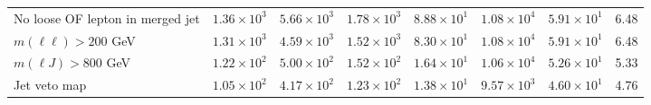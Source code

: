 \begin{table}[htp]
{\begin{tabular}{l | c c c c | c c c}
      No loose OF lepton in merged jet & $1.36 \times 10^{3}$ & $5.66 \times 10^{3}$ & $1.78 \times 10^{3}$ & $8.88 \times 10^{1}$ & $1.08 \times 10^{4}$ & $5.91 \times 10^{1}$ & 6.48 \\
      $m(\ell\ell) > 200$ GeV & $1.31 \times 10^{3}$ & $4.59 \times 10^{3}$ & $1.52 \times 10^{3}$ & $8.30 \times 10^{1}$ & $1.08 \times 10^{4}$ & $5.91 \times 10^{1}$ & 6.48 \\
      $m(\ell J) > 800$ GeV & $1.22 \times 10^{2}$ & $5.00 \times 10^{2}$ & $1.52 \times 10^{2}$ & $1.64 \times 10^{1}$ & $1.06 \times 10^{4}$ & $5.26 \times 10^{1}$ & 5.33 \\
      Jet veto map & $1.05 \times 10^{2}$ & $4.17 \times 10^{2}$ & $1.23 \times 10^{2}$ & $1.38 \times 10^{1}$ & $9.57 \times 10^{3}$ & $4.60 \times 10^{1}$ & 4.76 \\
      \hline
    \end{tabular}
  }
\end{table}
